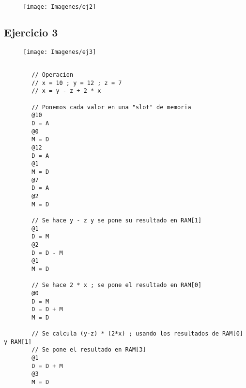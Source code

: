 \documentclass[12pt]{article}
\begin{document}
			\begin{figure}[H]
				\centering
				\texttt{[image: Imagenes/ej2]}
				\label{fig:ej2}
			\end{figure}
		\newpage
		\subsection{Ejercicio 3}
			\begin{figure}[H]
				\centering
				\texttt{[image: Imagenes/ej3]}
				\label{fig:ej3}
			\end{figure}

			\newpage
			\begin{lstlisting}

		// Operacion
		// x = 10 ; y = 12 ; z = 7
		// x = y - z + 2 * x

		// Ponemos cada valor en una "slot" de memoria
		@10
		D = A
		@0
		M = D
		@12
		D = A
		@1
		M = D
		@7
		D = A
		@2
		M = D

		// Se hace y - z y se pone su resultado en RAM[1]
		@1
		D = M
		@2
		D = D - M
		@1
		M = D

		// Se hace 2 * x ; se pone el resultado en RAM[0]
		@0
		D = M
		D = D + M
		M = D

		// Se calcula (y-z) * (2*x) ; usando los resultados de RAM[0] y RAM[1]
		// Se pone el resultado en RAM[3]
		@1
		D = D + M
		@3
		M = D
			\end{lstlisting}

\newpage

\printbibliography[title={Biliografía y agradecimientos}]
\end{document}
